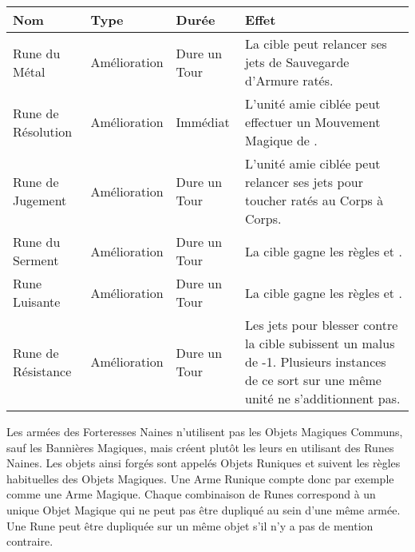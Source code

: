 \renewcommand{\arraystretch}{3.2}
\setlength{\arrayrulewidth}{2pt}
\begin{tabular}{@{}>{\raggedright}m{3.7cm}M{2.2cm}M{2.2cm}m{7.8cm}@{}}
\textbf{Nom} &
\textbf{Type} &
\textbf{Durée} &
\centering\textbf{Effet}
\tabularnewline\hline

Rune du Métal &
Amélioration &
Dure un Tour &
La cible peut relancer ses jets de Sauvegarde d'Armure ratés.
\tabularnewline\hline

Rune de Résolution &
Amélioration &
Immédiat &
L'unité amie ciblée peut effectuer un Mouvement Magique de . 
\tabularnewline\hline

Rune de Jugement &
Amélioration &
Dure un Tour &
L'unité amie ciblée peut relancer ses jets pour toucher ratés au Corps à Corps.
\tabularnewline\hline

Rune du Serment &
Amélioration &
Dure un Tour &
La cible gagne les règles \stubborn{} et \immunetopsychology{}.
\tabularnewline\hline

Rune Luisante &
Amélioration &
Dure un Tour &
La cible gagne les règles \hardtarget{} et \distracting{}.
\tabularnewline\hline

Rune de Résistance &
Amélioration &
Dure un Tour &
Les jets pour blesser contre la cible subissent un malus de -1. Plusieurs instances de ce sort sur une même unité ne s'additionnent pas.
\tabularnewline

\end{tabular}
\renewcommand{\arraystretch}{1.2} %

\closearmynewsection




\subtitle{}

Les armées des Forteresses Naines n'utilisent pas les Objets Magiques Communs, sauf les Bannières Magiques, mais créent plutôt les leurs en utilisant des Runes Naines. Les objets ainsi forgés sont appelés Objets Runiques et suivent les règles habituelles des Objets Magiques. Une Arme Runique compte donc par exemple comme une Arme Magique. Chaque combinaison de Runes correspond à un unique Objet Magique qui ne peut pas être dupliqué au sein d'une même armée. Une Rune peut être dupliquée sur un même objet s'il n'y a pas de mention contraire.

